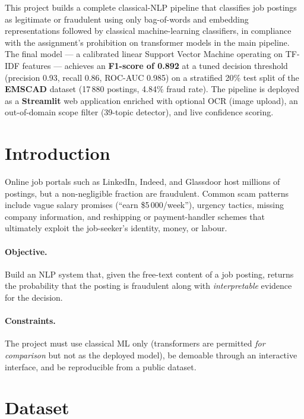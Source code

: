 \documentclass[11pt,a4paper]{article}
\begin{document}
This project builds a complete classical-NLP pipeline that classifies job
postings as legitimate or fraudulent using only bag-of-words and embedding
representations followed by classical machine-learning classifiers, in
compliance with the assignment's prohibition on transformer models in the
main pipeline. The final model --- a calibrated linear Support Vector Machine
operating on TF-IDF features --- achieves an \textbf{F1-score of 0.892} at a
tuned decision threshold (precision 0.93, recall 0.86, ROC-AUC 0.985) on a
stratified 20\% test split of the \textbf{EMSCAD} dataset (17\,880 postings,
4.84\% fraud rate). The pipeline is deployed as a \textbf{Streamlit} web
application enriched with optional OCR (image upload), an out-of-domain scope
filter (39-topic detector), and live confidence scoring.

\section{Introduction}

Online job portals such as LinkedIn, Indeed, and Glassdoor host millions of
postings, but a non-negligible fraction are fraudulent. Common scam patterns
include vague salary promises (``earn \$5\,000/week''), urgency tactics,
missing company information, and reshipping or payment-handler schemes that
ultimately exploit the job-seeker's identity, money, or labour.

\paragraph{Objective.} Build an NLP system that, given the free-text content
of a job posting, returns the probability that the posting is fraudulent
along with \emph{interpretable} evidence for the decision.

\paragraph{Constraints.} The project must use classical ML only (transformers
are permitted \emph{for comparison} but not as the deployed model), be
demoable through an interactive interface, and be reproducible from a public
dataset.

\section{Dataset}
\end{document}
